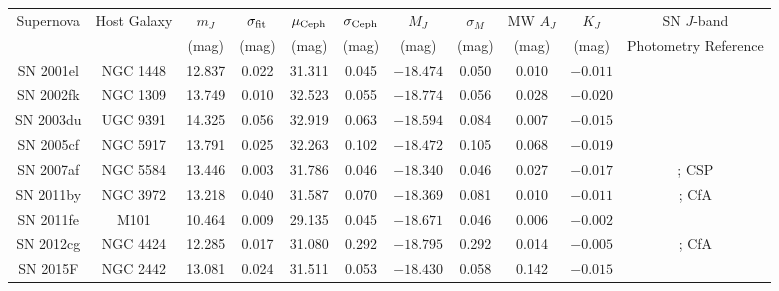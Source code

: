\begin{tabular}{|c|c|cc|cc|cc|c|c|c|}
\hline
Supernova & Host Galaxy & $m_J$ & $\sigma_{\rm fit}$ & 
 $\mu_{\rm Ceph}$ & $\sigma_{\rm Ceph}$  & 
 $M_J$ & $\sigma_M$  & MW $A_J$ & $K_J$ & SN $J$-band   \\
 & & (mag) & (mag) & (mag) & (mag) & (mag) & (mag) & (mag) & (mag) & Photometry Reference \\
\hline
SN 2001el & NGC 1448  & 12.837 & 0.022 & 31.311 & 0.045 & $-18.474$ & 0.050 & 0.010 & $-0.011$ & \citet{Krisciunas2004} \\
SN 2002fk & NGC 1309  & 13.749 & 0.010 & 32.523 & 0.055 & $-18.774$ & 0.056 & 0.028 & $-0.020$ & \citet{Cartier2014} \\
SN 2003du & UGC 9391  & 14.325 & 0.056 & 32.919 & 0.063 & $-18.594$ & 0.084 & 0.007 & $-0.015$ & \citet{Stanishev2007} \\
SN 2005cf & NGC 5917  & 13.791 & 0.025 & 32.263 & 0.102 & $-18.472$ & 0.105 & 0.068 & $-0.019$ & \citet{Wang2009} \\
SN 2007af & NGC 5584  & 13.446 & 0.003 & 31.786 & 0.046 & $-18.340$ & 0.046 & 0.027 & $-0.017$ & \citet{Contreras2010}; CSP \\
SN 2011by & NGC 3972  & 13.218 & 0.040 & 31.587 & 0.070 & $-18.369$ & 0.081 & 0.010 & $-0.011$ & \citet{Friedman2015}; CfA \\
SN 2011fe & M101      & 10.464 & 0.009 & 29.135 & 0.045 & $-18.671$ & 0.046 & 0.006 & $-0.002$ & \citet{Matheson2012} \\
SN 2012cg & NGC 4424  & 12.285 & 0.017 & 31.080 & 0.292 & $-18.795$ & 0.292 & 0.014 & $-0.005$ & \citet{Marion2016}; CfA \\
SN 2015F  & NGC 2442  & 13.081 & 0.024 & 31.511 & 0.053 & $-18.430$ & 0.058 & 0.142 & $-0.015$ & \citet{Cartier2017} \\
\hline
\end{tabular}
